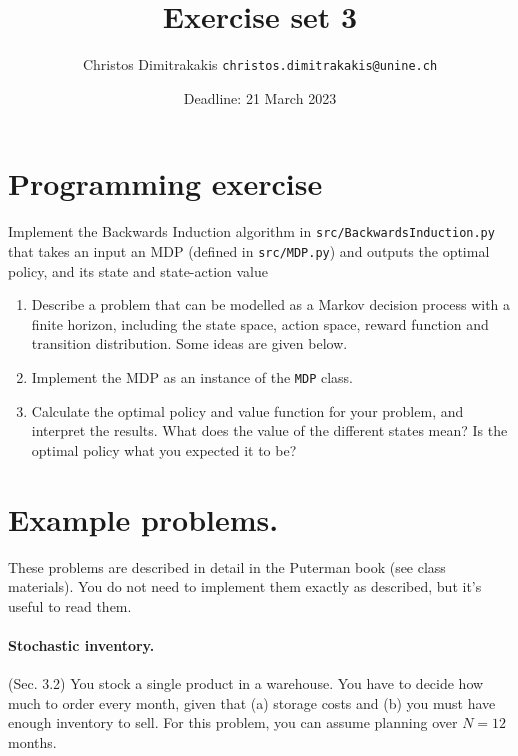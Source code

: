 \documentclass[twoside,a4paper]{article}
\begin{document}
\title{Exercise set 3}
\author{Christos Dimitrakakis  \texttt{christos.dimitrakakis@unine.ch}}
\date{Deadline: 21 March 2023}
\maketitle

\section{Programming exercise}
\begin{exercise}[In class] Implement the Backwards Induction algorithm in \verb!src/BackwardsInduction.py! that takes an input an MDP (defined in \verb|src/MDP.py|) and outputs the optimal policy, and its state and state-action value
\end{exercise}

\begin{exercise}
  \begin{enumerate}  
  \item Describe a problem that can be modelled as a Markov decision process with a finite horizon, including the state space, action space, reward function and transition distribution. Some ideas are given below.
  \item Implement the MDP as an instance of the \verb|MDP| class.
  \item Calculate the optimal policy and value function for your problem, and interpret the results. What does the value of the different states mean? Is the optimal policy what you expected it to be? 
  \end{enumerate}
\end{exercise}

\iftrue
  \section{Example problems.}
  These problems are described in detail in the Puterman book (see class materials). You do not need to implement them exactly as described, but it's useful to read them. 
  
  \paragraph{Stochastic inventory.}  (Sec. 3.2) You stock a single product in a warehouse. You have to decide how much to order every month, given that (a) storage costs and (b) you must have enough inventory to sell. For this problem, you can assume planning over $N=12$ months. 
\end{document}
